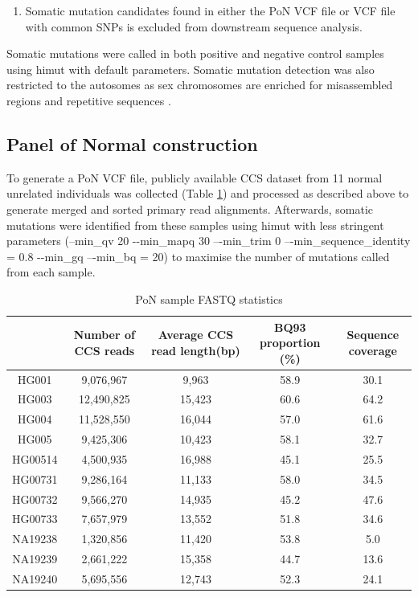 \begin{enumerate}
\item Somatic mutation candidates found in either the PoN VCF file or VCF file with common SNPs is excluded from downstream sequence analysis. 
\end{enumerate}

Somatic mutations were called in both positive and negative control samples using himut with default parameters. Somatic mutation detection was also restricted to the autosomes as sex chromosomes are enriched for misassembled regions and repetitive sequences \cite{Skaletsky2003-sr}.

\subsection{Panel of Normal construction}

To generate a PoN VCF file, publicly available CCS dataset from 11 normal unrelated individuals was collected \cite{Zook2019-pm} (Table \ref{tab:pon-fastq-statistics}) and processed as described above to generate merged and sorted primary read alignments. Afterwards, somatic mutations were identified from these samples using himut with less stringent parameters (--min\_qv 20 -{}-min\_mapq 30 –{}-min\_trim 0 –{}-min\_sequence\_identity = 0.8 -{}-min\_gq –{}-min\_bq = 20) to maximise the number of mutations called from each sample. 

\begin{table}[h!]
\caption{PoN sample FASTQ statistics}
\label{tab:pon-fastq-statistics}
\begin{adjustbox}{max width=1.1\textwidth,center}
\begin{tabular}{c|c|c|c|c}
& Number of CCS reads & Average CCS read length(bp) & BQ93 proportion (\%) & Sequence coverage \\ \hline
HG001 & 9,076,967 & 9,963 & 58.9 & 30.1 \\ \hline
HG003 & 12,490,825 & 15,423 & 60.6 & 64.2 \\ \hline
HG004 & 11,528,550 & 16,044 & 57.0 & 61.6 \\ \hline
HG005 & 9,425,306 & 10,423 & 58.1 & 32.7  \\ \hline
HG00514 & 4,500,935 & 16,988 & 45.1 & 25.5 \\ \hline
HG00731 & 9,286,164 & 11,133 & 58.0 & 34.5 \\ \hline
HG00732 & 9,566,270 & 14,935 & 45.2 & 47.6 \\ \hline
HG00733 & 7,657,979 & 13,552 & 51.8 & 34.6 \\ \hline
NA19238 & 1,320,856 & 11,420 & 53.8 & 5.0 \\ \hline
NA19239 & 2,661,222 & 15,358 & 44.7 & 13.6 \\ \hline
NA19240 & 5,695,556 & 12,743 & 52.3 & 24.1 \\ \hline
\end{tabular}
\end{adjustbox}
\end{table}

